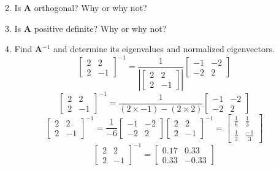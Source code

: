 \documentclass[12pt,a4paper]{paper}
\begin{document}
\begin{enumerate}
\begin{enumerate}
\begin{equation}
\end{equation}
\item Is \textbf{A} orthogonal? Why or why not?
\item Is \textbf{A} positive definite? Why or why not?
\item Find \textbf{A}$^{-1}$ and determine its eigenvalues and normalized eigenvectors.
\begin{equation}
\left[\begin{array}{cc}2 & 2 \\ 2 & -1\end{array}\right]^{-1} = \frac{1}{\left|\left[\begin{array}{cc}2 & 2 \\ 2 & -1\end{array}\right]\right|}\left[\begin{array}{cc}-1 & -2 \\ -2 & 2\end{array}\right]
\end{equation}
\begin{equation}
\left[\begin{array}{cc}2 & 2 \\ 2 & -1\end{array}\right]^{-1} = \frac{1}{\left(2 \times -1\right)-\left(2 \times 2\right)}\left[\begin{array}{cc}-1 & -2 \\ -2 & 2\end{array}\right]
\end{equation}
\begin{equation}
\left[\begin{array}{cc}2 & 2 \\ 2 & -1\end{array}\right]^{-1} = \frac{1}{-6}\left[\begin{array}{cc}-1 & -2 \\ -2 & 2\end{array}\right]
\left[\begin{array}{cc}2 & 2 \\ 2 & -1\end{array}\right]^{-1} = \left[\begin{array}{cc}\frac{1}{6} & \frac{1}{3} \\ \frac{1}{3} & \frac{-1}{3}\end{array}\right]
\end{equation}
\begin{equation}
\left[\begin{array}{cc}2 & 2 \\ 2 & -1\end{array}\right]^{-1} = \left[\begin{array}{cc}0.17 & 0.33 \\ 0.33 & -0.33\end{array}\right]

\end{equation}
\end{enumerate}
\end{enumerate}
\end{document}
